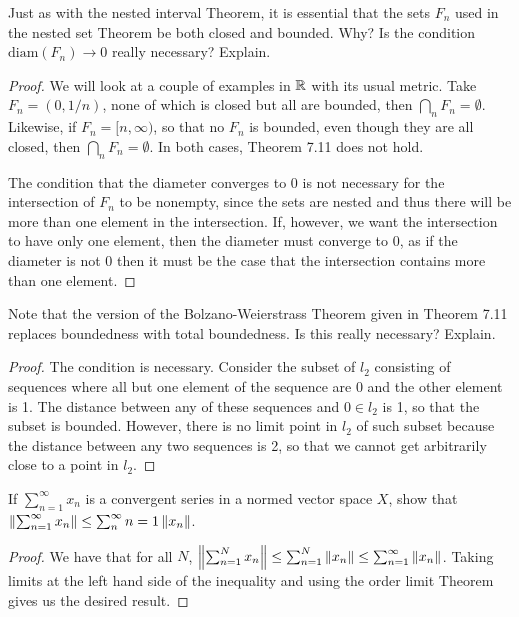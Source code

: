\begin{exercise}{26}
Just as with the nested interval Theorem, it is essential that the sets $F_n$ used in the nested set Theorem be both closed and bounded.
Why?
Is the condition $\text{diam}(F_n)\to 0$ really necessary?
Explain.
\end{exercise}
\begin{proof}
We will look at a couple of examples in $\mathbb{R}$ with its usual metric.
Take $F_n=(0,1/n)$, none of which is closed but all are bounded, then $\bigcap_n F_n =\emptyset$.
Likewise, if $F_n=[n,\infty)$, so that no $F_n$ is bounded, even though they are all closed, then $\bigcap_nF_n=\emptyset$.
In  both cases, Theorem 7.11 does not hold.

The condition that the diameter converges to 0 is not necessary for the intersection of $F_n$ to be nonempty, since the sets are nested and thus there will be more than one element in the intersection. 
If, however, we want the intersection to have only one element, then the diameter must converge to 0, as if the diameter is not 0 then it must be the case that the intersection contains more than one element.
\end{proof} 

\begin{exercise}{27}
Note that the version of the Bolzano-Weierstrass Theorem given in Theorem 7.11 replaces boundedness with total boundedness.
Is this really necessary?
Explain.
\end{exercise}
\begin{proof}
The condition is necessary.
Consider the subset of $l_2$ consisting of sequences where all but one element of the sequence are 0 and the other element is 1.
The distance between any of these sequences and $0\in l_2$ is 1, so that the subset is bounded.
However,  there is no limit point in $l_2$ of such subset because the distance between any two sequences is 2, so that we cannot get arbitrarily close to a point in $l_2$.
\end{proof} 

\begin{exercise}{31}
If $\sum^\infty_{n=1}x_n$ is a convergent series in a normed vector space $X$, show  that $\left\lVert \sum^\infty_{n=1}x_n\right\rVert\leq \sum^\infty_n{n=1}\left\lVert x_n\right\rVert$.
\end{exercise}
\begin{proof}
We have that for all $N$, $\left\lVert \sum^N_{n=1}x_n\right\rVert \leq \sum^N_{n=1} \left\lVert x_n\right\rVert \leq \sum^\infty_{n=1} \left\lVert x_n\right\rVert$.
Taking limits at the left hand side of the inequality and using the order limit Theorem gives us the desired result.
\end{proof} 

